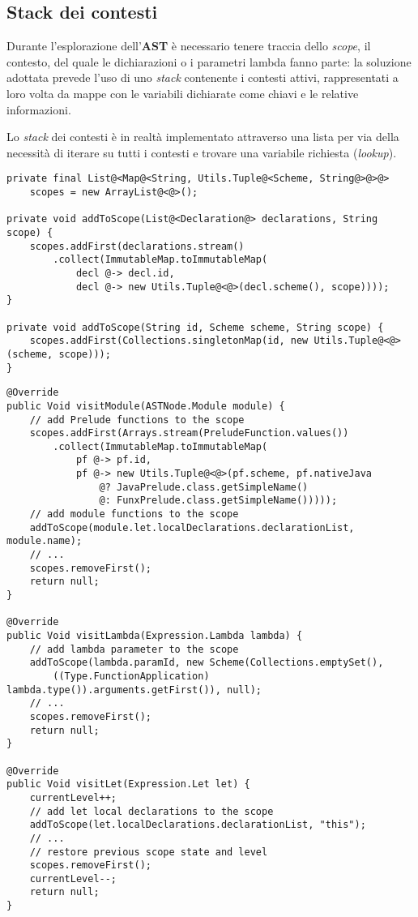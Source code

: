\subsection{Stack dei contesti}
\label{sec:5-12-scope-stack}

Durante l'esplorazione dell'\textbf{AST} è necessario tenere traccia dello \textit{scope}, il contesto, del quale le dichiarazioni
o i parametri lambda fanno parte: la soluzione adottata prevede l'uso di uno \textit{stack} contenente i contesti attivi,
rappresentati a loro volta da mappe con le variabili dichiarate come chiavi e le relative informazioni.

\noindent Lo \textit{stack} dei contesti è in realtà implementato attraverso una lista per via della necessità di iterare
su tutti i contesti e trovare una variabile richiesta (\textit{lookup}).

\vspace{4mm}
\begin{lstlisting}[caption={Struttura e metodi per lo \textit{scope}}, style=javaCode, label={lst:5-12-scope-stack-methods-java}]
private final List@<Map@<String, Utils.Tuple@<Scheme, String@>@>@>
    scopes = new ArrayList@<@>();

private void addToScope(List@<Declaration@> declarations, String scope) {
    scopes.addFirst(declarations.stream()
        .collect(ImmutableMap.toImmutableMap(
            decl @-> decl.id,
            decl @-> new Utils.Tuple@<@>(decl.scheme(), scope))));
}

private void addToScope(String id, Scheme scheme, String scope) {
    scopes.addFirst(Collections.singletonMap(id, new Utils.Tuple@<@>(scheme, scope)));
}
\end{lstlisting}
\vspace{4mm}
\begin{lstlisting}[caption={Aggiunta di contesto per modulo, lambda astrazioni e \texttt{let}}, style=javaCode, label={lst:5-12-lambda-let-scope-java}]
@Override
public Void visitModule(ASTNode.Module module) {
    // add Prelude functions to the scope
    scopes.addFirst(Arrays.stream(PreludeFunction.values())
        .collect(ImmutableMap.toImmutableMap(
            pf @-> pf.id,
            pf @-> new Utils.Tuple@<@>(pf.scheme, pf.nativeJava
                @? JavaPrelude.class.getSimpleName()
                @: FunxPrelude.class.getSimpleName()))));
    // add module functions to the scope
    addToScope(module.let.localDeclarations.declarationList, module.name);
    // ...
    scopes.removeFirst();
    return null;
}

@Override
public Void visitLambda(Expression.Lambda lambda) {
    // add lambda parameter to the scope
    addToScope(lambda.paramId, new Scheme(Collections.emptySet(),
        ((Type.FunctionApplication) lambda.type()).arguments.getFirst()), null);
    // ...
    scopes.removeFirst();
    return null;
}

@Override
public Void visitLet(Expression.Let let) {
    currentLevel++;
    // add let local declarations to the scope
    addToScope(let.localDeclarations.declarationList, "this");
    // ...
    // restore previous scope state and level
    scopes.removeFirst();
    currentLevel--;
    return null;
}
\end{lstlisting}


